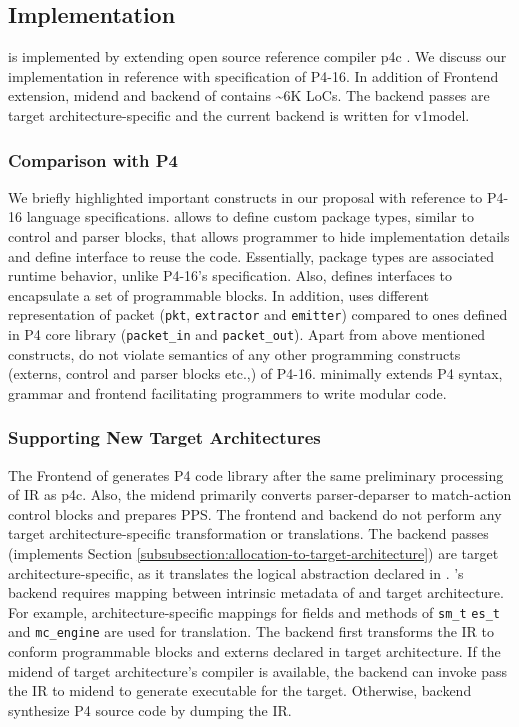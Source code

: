 \documentclass[letterpaper,twocolumn,10pt]{article}
\begin{document}
\subsection{Implementation}
\ucomp is implemented by extending open source reference compiler p4c \cite{p4c}.
We discuss our implementation in reference with specification of P4-16.
In addition of Frontend extension, midend and backend of \ucomp contains \textasciitilde 6K LoCs.
The backend passes are target architecture-specific and the current backend is written for v1model.

\subsubsection{Comparison with P4}
We briefly highlighted important constructs in our proposal with reference to P4-16 language specifications.
\ucomp allows to define custom package types, similar to control and parser blocks, that allows programmer to hide implementation details and define interface to reuse the code.
Essentially, package types are associated runtime behavior, unlike P4-16's specification.
Also, \uarch defines interfaces to encapsulate a set of programmable blocks.
In addition, \uarch uses different representation of packet (\texttt{pkt}, \texttt{extractor} and \texttt{emitter}) compared to ones defined in P4 core library (\texttt{packet\_in} and \texttt{packet\_out}).
Apart from above mentioned constructs, \ulang do not violate semantics of any other programming constructs (externs, control and parser blocks etc.,) of P4-16.
\ucomp minimally extends P4 syntax, grammar and frontend facilitating programmers to write modular code.


\subsubsection{Supporting New Target Architectures}
The Frontend of \ucomp generates P4 code library after the same preliminary processing of IR as p4c.
Also, the midend primarily converts parser-deparser to match-action control blocks and prepares PPS.
The frontend and backend do not perform any target architecture-specific transformation or translations.
The backend passes (implements Section \ref{subsubsection:allocation-to-target-architecture}) are target architecture-specific, as it translates the logical abstraction declared in \uarch.
\ucomp's backend requires mapping between intrinsic metadata of \uarch and target architecture.
For example, architecture-specific mappings for fields and methods of \texttt{sm\_t} \texttt{es\_t} and \texttt{mc\_engine} are used for translation.
The backend first transforms the IR to conform programmable blocks and externs declared in target architecture.
If the midend of target architecture's compiler is available, the backend can invoke pass the IR to midend to generate executable for the target.
Otherwise, backend synthesize P4 source code by dumping the IR.
\end{document}
